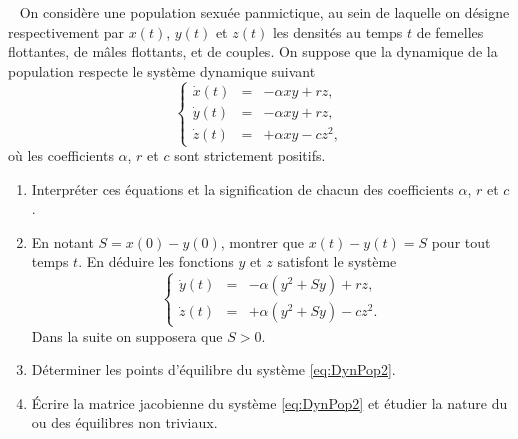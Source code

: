 
\begin{exercise} ~ \label{exam:DynPop}
  On considère une population sexuée panmictique, au sein de laquelle on désigne
  respectivement par $x(t)$, $y(t)$ et $z(t)$ les densités au temps $t$ de femelles flottantes, de mâles flottants, et de couples. On suppose que la dynamique de la population respecte le système dynamique suivant
  \begin{equation} \label{eq:DynPop}
    \left\{\begin{array}{rcl}
            \dot x(t) & = & - \alpha x y + r z, \\
            \dot y(t) & = & - \alpha x y + r z, \\
            \dot z(t) & = & + \alpha x y - c z^2,
           \end{array} \right.
  \end{equation}
  où les coefficients $\alpha$, $r$ et $c$ sont strictement positifs.
  \begin{enumerate}
   \item Interpréter ces équations et la signification de chacun des coefficients $\alpha$, $r$ et $c$.
   \item En notant $S = x(0) - y(0)$, montrer que $x(t) - y(t) = S$ pour tout temps $t$. En déduire les fonctions $y$ et $z$ satisfont le système 
  \begin{equation} \label{eq:DynPop2}
    \left\{\begin{array}{rcl}
            \dot y(t) & = & - \alpha (y^2 + Sy) + r z, \\
            \dot z(t) & = & + \alpha (y^2 + Sy) - c z^2.
           \end{array} \right.
  \end{equation}
  Dans la suite on supposera que $S > 0$.
  \item Déterminer les points d'équilibre du système \eqref{eq:DynPop2}.
  \item \'Ecrire la matrice jacobienne du système \eqref{eq:DynPop2} et étudier la nature du ou des équilibres non triviaux.
  \end{enumerate}
\end{exercise}

